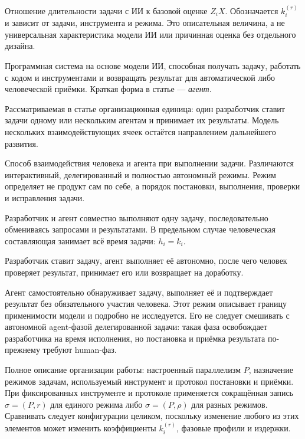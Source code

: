 \begin{description}[style=nextline]
  \item[Нормированная длительность с ИИ] Отношение длительности задачи с ИИ к
  базовой оценке $Z_iX$. Обозначается $k_i^{(r)}$ и зависит от задачи,
  инструмента и режима. Это описательная величина, а не универсальная
  характеристика модели ИИ или причинная оценка без отдельного дизайна.

  \item[ИИ-агент для программирования] Программная система на основе модели
  ИИ, способная получать задачу, работать с кодом и инструментами и возвращать
  результат для автоматической либо человеческой приёмки. Краткая форма в
  статье --- \emph{агент}.

  \item[Человеко-агентная ячейка] Рассматриваемая в статье организационная
  единица: один разработчик ставит задачи одному или нескольким агентам и
  принимает их результаты. Модель нескольких взаимодействующих ячеек остаётся
  направлением дальнейшего развития.

  \item[Режим работы] Способ взаимодействия человека и агента при выполнении
  задачи. Различаются интерактивный, делегированный и полностью автономный
  режимы. Режим определяет не продукт сам по себе, а порядок постановки,
  выполнения, проверки и исправления задачи.

  \item[Интерактивный режим] Разработчик и агент совместно выполняют одну
  задачу, последовательно обмениваясь запросами и результатами. В предельном
  случае человеческая составляющая занимает всё время задачи: $h_i=k_i$.

  \item[Делегированный режим] Разработчик ставит задачу, агент выполняет её
  автономно, после чего человек проверяет результат, принимает его или
  возвращает на доработку.

  \item[Полностью автономный режим] Агент самостоятельно обнаруживает задачу,
  выполняет её и подтверждает результат без обязательного участия человека.
  Этот режим описывает границу применимости модели и подробно не исследуется.
  Его не следует смешивать с автономной agent-фазой делегированной задачи:
  такая фаза освобождает разработчика на время исполнения, но постановка и
  приёмка результата по-прежнему требуют human-фаз.

  \item[Конфигурация процесса] Полное описание организации работы: настроенный
  параллелизм $P$, назначение режимов задачам, используемый инструмент и
  протокол постановки и приёмки. При фиксированных инструменте и протоколе
  применяется сокращённая запись $\sigma=(P,r)$ для единого режима либо
  $\sigma=(P,\rho)$ для разных режимов. Сравнивать следует конфигурации целиком,
  поскольку изменение любого из этих элементов может изменить коэффициенты
  $k_i^{(r)}$, фазовые профили и издержки.


\end{description}

